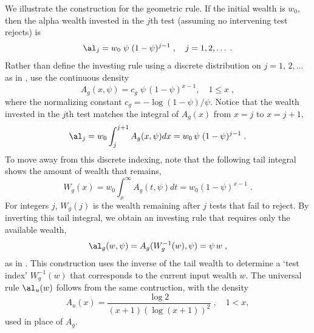 \documentclass[12pt]{article}
\begin{document}
We illustrate the construction for the geometric rule.  If the initial wealth
 is $w_0$, then the alpha wealth invested in the $j$th test (assuming no
 intervening test rejects) is
 \begin{equation}
    \al_j = w_0\; \psi \; (1-\psi)^{j-1} \;, \quad j = 1, 2, \ldots\;.   
 \label{eq:alj1}
 \end{equation}
  Rather than define the investing rule using a discrete distribution on
 $j=1,\,2,\ldots$ as in , use the continuous density
 \begin{equation}
   A_g(x,\psi) = c_g \; \psi\,(1-\psi)^{x-1}, \quad 1 \le x\;,
 \label{eq:alg}
 \end{equation}
 where the normalizing constant $c_g = -\log (1-\psi)/\psi$.  Notice that the
 wealth invested in the $j$th test  matches the integral of
 $A_g(x)$ from $x=j$ to $x=j+1$,
 \begin{equation}
    \al_j = w_0 \int_j^{j+1} A_g(x,\psi) dx = w_0 \, \psi\; (1-\psi)^{j-1} \;.
 \label{eq:alj2}
 \end{equation}
 To move away from this discrete indexing, note that the following tail integral
 shows the amount of wealth that remains,
 \begin{equation}
    W_g(x) = w_0 \int_x^\infty A_g(t,\psi) dt = w_0 (1-\psi)^{x-1}\;.
 \label{eq:Wg}
 \end{equation}
 For integers $j$, $W_g(j)$ is the wealth remaining after $j$ tests that fail to
 reject.  By inverting this tail integral, we obtain an investing rule that
 requires only the available wealth,
 \begin{equation}
   \al_g(w,\psi) = A_g(W_g^{-1}(w),\psi) = \psi\,w \;,
 \label{eq:Ag}
 \end{equation}
 as in .  This construction uses the inverse of the tail wealth to
 determine a `test index' $W_g^{-1}(w)$ that corresponds to the current input
 wealth $w$.  The universal rule $\al_u(w)$ follows from the same
 contruction, with the density
 \begin{displaymath}
    A_u(x) = \frac{\log 2}{(x+1) (\log(x+1))^2} \;, \quad 1 < x,
 \end{displaymath}
 used in place of $A_g$.

\end{document}
